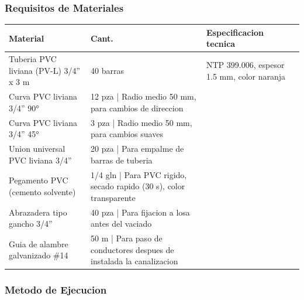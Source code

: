 \subsubsection{Requisitos de Materiales}

\begin{longtable}{L{5.0cm} L{2.0cm} L{7.5cm}}
\toprule
\textbf{Material} & \textbf{Cant.} & \textbf{Especificacion tecnica} \\
\midrule
Tuberia PVC liviana (PV-L) 3/4'' x 3 m & 40 barras & NTP 399.006, espesor 1.5 mm, color naranja \\
Curva PVC liviana 3/4'' 90° & 12 pza | Radio medio 50 mm, para cambios de direccion \\
Curva PVC liviana 3/4'' 45° & 3 pza | Radio medio 50 mm, para cambios suaves \\
Union universal PVC liviana 3/4'' & 20 pza | Para empalme de barras de tuberia \\
Pegamento PVC (cemento solvente) & 1/4 gln | Para PVC rigido, secado rapido (30 s), color transparente \\
Abrazadera tipo gancho 3/4'' & 40 pza | Para fijacion a losa antes del vaciado \\
Guia de alambre galvanizado \#14 & 50 m | Para paso de conductores despues de instalada la canalizacion \\
\bottomrule
\end{longtable}

\subsubsection{Metodo de Ejecucion}


